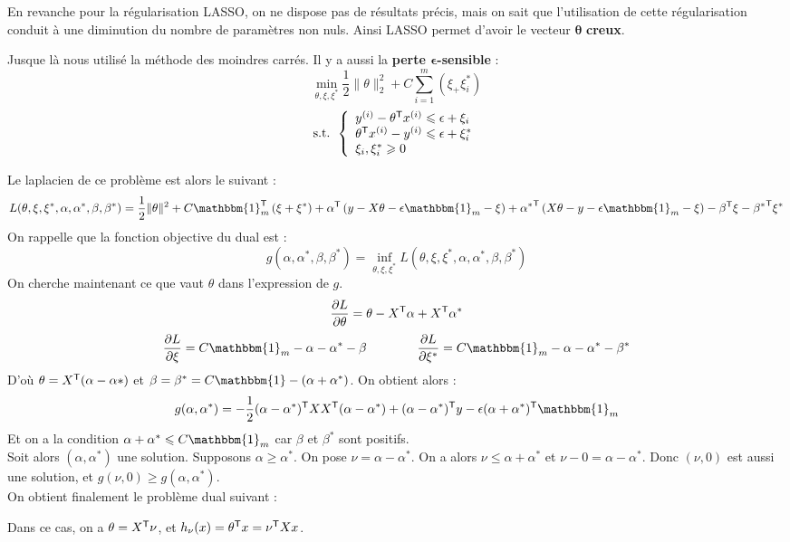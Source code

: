 En revanche pour la régularisation LASSO, on ne dispose pas de résultats précis, mais on sait que l'utilisation de cette régularisation conduit à une diminution du nombre de paramètres non nuls. Ainsi LASSO permet d'avoir le vecteur $\bm{\theta}$ \textbf{creux}.


Jusque là nous utilisé la méthode des moindres carrés. Il y a aussi la \textbf{perte $\bm{\epsilon}$-sensible} :
$$ \min_{\theta, \xi, \xi^*} \frac{1}{2} \| \theta \|_2^2 + C \sum_{i = 1}^m \left( \xi_ + \xi_i^* \right) $$
\vspace{-2mm}
$$ \text{s.t. } \left\{ \begin{array}{l}
	y^{(i)} - \theta^{\mathsf{T}} x^{(i)} \leqslant \epsilon + \xi_i \\
	\theta^{\mathsf{T}} x^{(i)} - y^{(i)} \leqslant \epsilon + \xi_i^* \\
	\xi_i, \xi_i^* \geqslant 0
\end{array} \right. $$

Le laplacien de ce problème est alors le suivant :
$$ L(\theta, \xi, \xi^*, \alpha, \alpha^*, \beta, \beta^*) = \dfrac{1}{2} \| \theta \|^2 + C \mathbbm{1}_m^\trans \left( \xi + \xi^* \right) + \alpha^\trans \left( y - X \theta - \epsilon \mathbbm{1}_m - \xi \right) + {\alpha^*}^\trans \left( X \theta - y - \epsilon \mathbbm{1}_m - \xi \right) - \beta^\trans \xi - {\beta^*}^\trans \xi^*$$
On rappelle que la fonction objective du dual est :
$$ g(\alpha, \alpha^*, \beta, \beta^*) = \inf_{\theta, \xi, \xi^*} L(\theta, \xi, \xi^*, \alpha, \alpha^*, \beta, \beta^*) $$
On cherche maintenant ce que vaut $\theta$ dans l'expression de $g$.
$$ \dfrac{\partial L}{\partial \theta} = \theta - X^{\mathsf{T}} \alpha + X^{\mathsf{T}} \alpha^* $$
$$ \dfrac{\partial L}{\partial \xi} = C \mathbbm{1}_m - \alpha - \alpha^* - \beta \qquad \qquad
\dfrac{\partial L}{\partial \xi^*} = C \mathbbm{1}_m - \alpha - \alpha^* - \beta^* $$
D'où $\theta = X^{\mathsf{T}} (\alpha - \alpha*)$ et $\beta = \beta^* = C \mathbbm{1} - (\alpha + \alpha^*)$. On obtient alors :
$$ g(\alpha, \alpha^*) = -\dfrac{1}{2} (\alpha - \alpha^*)^\trans X X^\trans (\alpha - \alpha^*) + (\alpha - \alpha^*)^\trans y - \epsilon (\alpha + \alpha^*)^\trans \mathbbm{1}_m $$
Et on a la condition $\alpha + \alpha^* \leqslant C \mathbbm{1}_m$ car $\beta$ et $\beta^*$ sont positifs. \\ Soit alors $(\alpha, \alpha^*)$ une solution. Supposons $\alpha \geqslant \alpha^*$. On pose $\nu = \alpha - \alpha^*$. On a alors $\nu \leqslant \alpha + \alpha^*$ et $\nu - 0 = \alpha - \alpha^*$. Donc $(\nu, 0)$ est aussi une solution, et $g(\nu, 0) \geqslant g(\alpha, \alpha^*)$. \\
On obtient finalement le problème dual suivant :
\begin{center}
\end{center}
Dans ce cas, on a $\theta = X^{\mathsf{T}} \nu$, et $h_\nu(x) = \theta^{\mathsf{T}} x = \nu^{\mathsf{T}} X x$.

